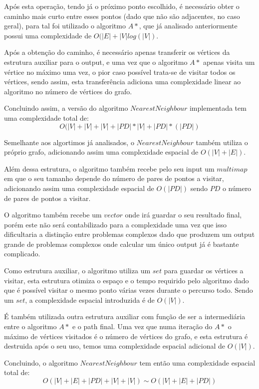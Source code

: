 \documentclass[article, a4paper, 12pt, oneside]{memoir}
\begin{document}
Após esta operação, tendo já o próximo ponto escolhido, é necessário obter o caminho mais curto entre esses pontos (dado que não são adjacentes, no caso geral), para tal foi utilizado o algoritmo $A*$, que já analisado anteriormente possui uma complexidade de $O(|E|+|V|log(|V|)$.

Após a obtenção do caminho, é necessário apenas transferir os vértices da estrutura auxiliar para o output, e uma vez que o algoritmo $A*$ apenas visita um vértice no máximo uma vez, o pior caso possível trata-se de visitar todos os vértices, sendo assim, esta transferência adiciona uma complexidade linear ao algoritmo no número de vértices do grafo.

Concluindo assim, a versão do algoritmo $NearestNeighbour$ implementada tem uma complexidade total de:
\begin{equation}
O(|V|+|V|+|V|+ |PD|*|V| + |PD| * (|PD|)
\end{equation}

Semelhante aos algortimos já analisados, o $NearestNeighbour$ também utiliza o próprio grafo, adicionando assim uma complexidade espacial de $O(|V|+|E|)$.

Além dessa estrutura, o algoritmo também recebe pelo seu input um $multimap$ em que o seu tamanho depende do número de pares de pontos a visitar, adicionando assim uma complexidade espacial de $O(|PD|)$ sendo $PD$ o número de pares de pontos a visitar.

O algoritmo também recebe um $vector$ onde irá guardar o seu resultado final, porém este não será contabilizado para a complexidade uma vez que isso dificultaria a distinção entre problemas complexos dado que produzem um output grande de problemas complexos onde calcular um único output já é bastante complicado.

Como estrutura auxiliar, o algoritmo utiliza um $set$ para guardar os vértices a visitar, esta estrutura otimiza o espaço e o tempo requirido pelo algoritmo dado que é possível visitar o mesmo ponto várias vezes durante o percurso todo. Sendo um $set$, a complexidade espacial introduzida é de $O(|V|)$.

É também utilizada outra estrutura auxiliar com função de ser a intermediária entre o algoritmo $A*$ e o path final. Uma vez que numa iteração do $A*$ o máximo de vértices visitados é o número de vértices do grafo, e esta estrutura é destruida após o seu uso, temos uma complexidade espacial adicional de $O(|V|)$.

Concluindo, o algoritmo $NearestNeighbour$ tem então uma complexidade espacial total de:
\begin{equation}
O(|V|+|E|+|PD|+|V|+|V|) \sim O(|V|+|E|+|PD|)
\end{equation}
\end{document}
